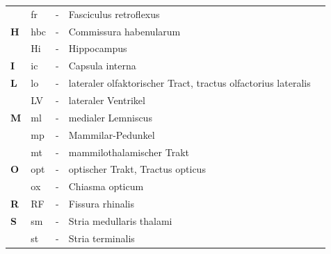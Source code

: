 \documentclass[12pt,a4paper,pdftex]{article}
\begin{document}
\begin{table}[H]
\begin{tabular}{llcll}
\textbf{}  & fr  & -          & Fasciculus retroflexus                                                  &                               \\
\textbf{H} & hbc & -          & Commissura habenularum                                                  &                               \\
\textbf{}  & Hi  & -          & Hippocampus                                                             &                               \\
\textbf{I} & ic  & -          & Capsula interna                                                         &                               \\
\textbf{L} & lo  & -          & lateraler olfaktorischer Tract, tractus olfactorius lateralis           &                               \\
\textbf{}  & LV  & -          & lateraler Ventrikel                                                     &                               \\
\textbf{M} & ml  & -          & medialer Lemniscus                                                      &                               \\
\textbf{}  & mp  & -          & Mammilar-Pedunkel                                                       &                               \\
\textbf{}  & mt  & -          & mammilothalamischer Trakt                                               &                               \\
\textbf{O} & opt & -          & optischer Trakt, Tractus opticus                                        &                               \\
\textbf{}  & ox  & -          & Chiasma opticum                                                         &                               \\
\textbf{R} & RF  & -          & Fissura rhinalis                                                        &                               \\
\textbf{S} & sm  & -          & Stria medullaris thalami                                                &                               \\
\textbf{}  & st  & -          & Stria terminalis                                                        &                               \\
\end{tabular}
\end{table}
\end{document}
